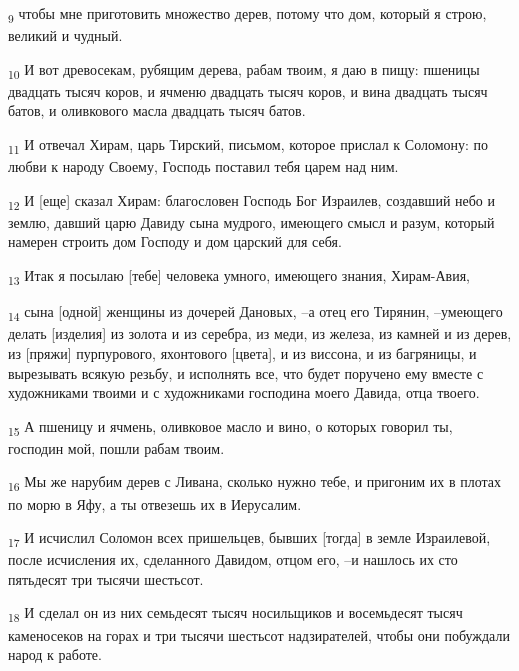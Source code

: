 \begin{tcolorbox}
\textsubscript{9} чтобы мне приготовить множество дерев, потому что дом, который я строю, великий и чудный.
\end{tcolorbox}
\begin{tcolorbox}
\textsubscript{10} И вот древосекам, рубящим дерева, рабам твоим, я даю в пищу: пшеницы двадцать тысяч коров, и ячменю двадцать тысяч коров, и вина двадцать тысяч батов, и оливкового масла двадцать тысяч батов.
\end{tcolorbox}
\begin{tcolorbox}
\textsubscript{11} И отвечал Хирам, царь Тирский, письмом, которое прислал к Соломону: по любви к народу Своему, Господь поставил тебя царем над ним.
\end{tcolorbox}
\begin{tcolorbox}
\textsubscript{12} И [еще] сказал Хирам: благословен Господь Бог Израилев, создавший небо и землю, давший царю Давиду сына мудрого, имеющего смысл и разум, который намерен строить дом Господу и дом царский для себя.
\end{tcolorbox}
\begin{tcolorbox}
\textsubscript{13} Итак я посылаю [тебе] человека умного, имеющего знания, Хирам-Авия,
\end{tcolorbox}
\begin{tcolorbox}
\textsubscript{14} сына [одной] женщины из дочерей Дановых, --а отец его Тирянин, --умеющего делать [изделия] из золота и из серебра, из меди, из железа, из камней и из дерев, из [пряжи] пурпурового, яхонтового [цвета], и из виссона, и из багряницы, и вырезывать всякую резьбу, и исполнять все, что будет поручено ему вместе с художниками твоими и с художниками господина моего Давида, отца твоего.
\end{tcolorbox}
\begin{tcolorbox}
\textsubscript{15} А пшеницу и ячмень, оливковое масло и вино, о которых говорил ты, господин мой, пошли рабам твоим.
\end{tcolorbox}
\begin{tcolorbox}
\textsubscript{16} Мы же нарубим дерев с Ливана, сколько нужно тебе, и пригоним их в плотах по морю в Яфу, а ты отвезешь их в Иерусалим.
\end{tcolorbox}
\begin{tcolorbox}
\textsubscript{17} И исчислил Соломон всех пришельцев, бывших [тогда] в земле Израилевой, после исчисления их, сделанного Давидом, отцом его, --и нашлось их сто пятьдесят три тысячи шестьсот.
\end{tcolorbox}
\begin{tcolorbox}
\textsubscript{18} И сделал он из них семьдесят тысяч носильщиков и восемьдесят тысяч каменосеков на горах и три тысячи шестьсот надзирателей, чтобы они побуждали народ к работе.
\end{tcolorbox}
